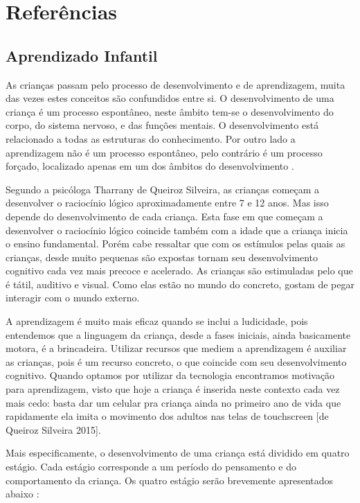 \chapter[Referências]{Referências}

\section{Aprendizado Infantil}

As crianças passam pelo processo de desenvolvimento e de aprendizagem, muita das vezes estes conceitos são confundidos
entre si. O desenvolvimento de uma criança é um processo espontâneo, neste âmbito tem-se o desenvolvimento do corpo, do
sistema nervoso, e das funções mentais. O desenvolvimento está relacionado a todas as estruturas do conhecimento. Por
outro lado a aprendizagem não é um processo espontâneo, pelo contrário é um processo forçado, localizado apenas em um
dos âmbitos do desenvolvimento \cite{piaget:1972}.

Segundo a psicóloga Tharrany de Queiroz Silveira, as crianças começam a desenvolver o raciocínio lógico aproximadamente
entre 7 e 12 anos. Mas isso depende do desenvolvimento de cada criança. Esta fase em que começam a desenvolver o
raciocínio lógico coincide também com a idade que a criança inicia o ensino fundamental. Porém cabe ressaltar que com
os estímulos pelas quais as crianças, desde muito pequenas são expostas tornam seu desenvolvimento cognitivo cada vez
mais precoce e acelerado. As crianças são estimuladas pelo que é tátil, auditivo e visual. Como elas estão no mundo do
concreto, gostam de pegar interagir com o mundo externo.

A aprendizagem é muito mais eficaz quando se inclui a ludicidade, pois entendemos que a linguagem da criança, desde a
fases iniciais, ainda basicamente motora, é a brincadeira. Utilizar recursos que mediem a aprendizagem é auxiliar as
crianças, pois é um recurso concreto, o que coincide com seu desenvolvimento cognitivo. Quando optamos por utilizar da
tecnologia encontramos motivação para aprendizagem, visto que hoje a criança é inserida neste contexto cada vez mais
cedo: basta dar um celular pra criança ainda no primeiro ano de vida que rapidamente ela imita o movimento dos adultos
nas telas de touchscreen [de Queiroz Silveira 2015].

Mais especificamente, o desenvolvimento de uma criança está dividido em quatro estágio. Cada estágio corresponde a um
período do pensamento e do comportamento da criança. Os quatro estágio serão brevemente apresentados abaixo \cite{piaget:1972}:

